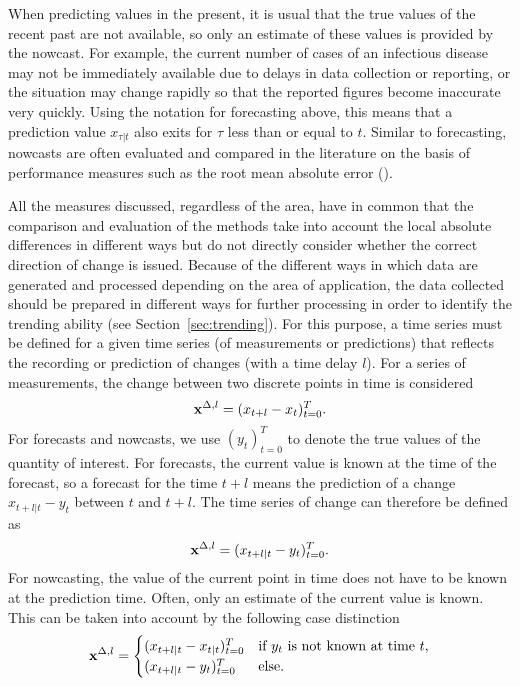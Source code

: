 When predicting values in the present, it is usual that the true values of the recent past are not available, so only an estimate of these values is provided by the nowcast. For example, the current number of cases of an infectious disease may not be immediately available due to delays in data collection or reporting, or the situation may change rapidly so that the reported figures become inaccurate very quickly.
Using the notation for forecasting above, this means that a prediction value $x_{\tau|t}$ also exits for $\tau$ less than or equal to $t$.
Similar to forecasting, nowcasts are often evaluated and compared in the literature on the basis of performance measures such as the root mean absolute error (\cite{gunther2021nowcasting}).

All the measures discussed, regardless of the area, have in common that the comparison and evaluation of the methods take into account the local absolute differences in different ways but do not directly consider whether the correct direction of change is issued.
Because of the different ways in which data are generated and processed depending on the area of application, the data collected should be prepared in different ways for further processing in order to identify the trending ability (see Section~\ref{sec:trending}). For this purpose, a time series must be defined for a given time series (of measurements or predictions) that reflects the recording or prediction of changes (with a time delay $l$). For a series of measurements, the change between two discrete points in time is considered
\begin{equation}
    \mathbf{x}^{\Delta,l} = (x_{t+l} -x_{t})^T_{t=0}. \label{eq:diffxl_measure}
\end{equation}
For forecasts and nowcasts, we use $(y_t)^T_{t=0}$ to denote the true values of the quantity of interest. For forecasts, the current value is known at the time of the forecast, so a forecast for the time $t+l$ means the prediction of a change $x_{t+l|t} -y_{t}$ between $t$ and $t+l$. The time series of change can therefore be defined as 
\begin{equation}
    \mathbf{x}^{\Delta,l} = (x_{t+l|t} -y_{t})^T_{t=0}.\label{eq:diffxl_forecasting}
\end{equation}
For nowcasting, the value of the current point in time does not have to be known at the prediction time. Often, only an estimate of the current value is known. This can be taken into account by the following case distinction
\begin{equation}
\mathbf{x}^{\Delta,l} = 
\begin{cases} 
(x_{t+l|t} -x_{t|t})^T_{t=0} & \text{if } y_{t} \text{ is not known at time } t, \\
(x_{t+l|t} -y_{t})^T_{t=0}  & \text{else}.
\end{cases} \label{eq:diffxl_nowcasting}
\end{equation}



